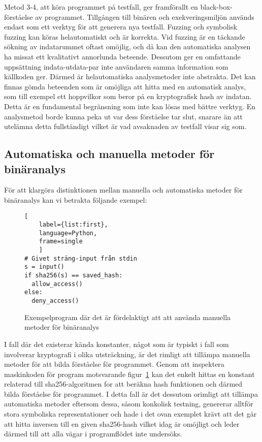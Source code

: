 Metod 3-4, att köra programmet på testfall, ger framförallt en
black-box-förståelse av programmet. Tillgången till binären och
exekveringsmiljön används endast som ett verktyg för att generera nya testfall.
Fuzzing och symbolisk fuzzing kan köras helautomatiskt och är korrekta.
Vid fuzzing är en täckande sökning av indatarummet oftast omöjlig, och då kan
den automatiska analysen ha missat ett kvalitativt annorlunda beteende. Dessutom
ger en omfattande uppsättning indata-utdata-par inte användaren samma
information som källkoden ger. Därmed är helautomatiska analysmetoder inte
abstrakta. Det kan finnas gömda beteenden som är omöjliga att hitta med en automatisk
analys, som till exempel ett hoppvilkor som beror på en kryptografisk hash av indatan.
Detta är en fundamental begränsning som inte kan lösas med bättre verktyg.
En analysmetod borde kunna peka ut var dess förståelse tar slut, snarare än att
utelämna detta fullständigt vilket är vad avsaknaden av testfall visar sig som.


\subsection{Automatiska och manuella metoder för binäranalys}
För att klargöra distinktionen mellan manuella och automatiska metoder för
binäranalys kan vi betrakta följande exempel:

\begin{figure}
    \begin{lstlisting}[
    label={list:first},
    language=Python,
    frame=single
    ]
# Givet sträng-input från stdin
s = input()
if sha256(s) == saved_hash:
  allow_access()
else:
  deny_access()
\end{lstlisting}
    \caption{Exempelprogram där det är fördelaktigt att att använda manuella metoder för binäranalys}
    \label{fig:manual_method_example}
\end{figure}

I fall där det existerar kända konstanter, något som är typiskt i fall som
involverar kryptografi i olika utsträckning, är det rimligt att tillämpa
manuella metoder för att bilda förståelse för programmet. Genom att inspektera
maskinkoden för program motsvarande figur~\ref{fig:manual_method_example} kan
det enkelt hittas en konstant relaterad till sha256-algoritmen for att beräkna
hash funktionen och därmed bilda förståelse för programmet. I detta fall är det
dessutom orimligt att tillämpa automatiska metoder eftersom dessa, såsom
konkolisk testning, genererar alltför stora symboliska representationer och hade
i det ovan exemplet krävt att det går att hitta inversen till en given
sha256-hash vilket idag är omöjligt och leder därmed till att alla vägar i
programflödet inte undersöks.

